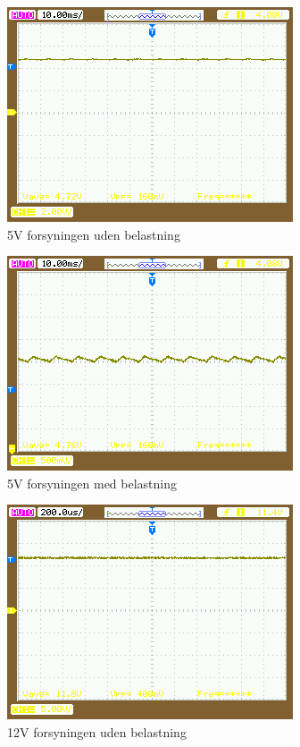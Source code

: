 \begin{figure}[H]
	\centering
	\includegraphics[scale=1]{../Hardware/PSU/Realisering/5VnoLoad}
	\caption{5V forsyningen uden belastning}
	\label{photo:5VnoLoad}
\end{figure}
\begin{figure}[H]
	\centering
	\includegraphics[scale=1]{../Hardware/PSU/Realisering/5VwithLoad}
	\caption{5V forsyningen med belastning}
	\label{photo:5VwithLoad}
\end{figure}
\begin{figure}[H]
	\centering
	\includegraphics[scale=1]{../Hardware/PSU/Realisering/12VnoLoad}
	\caption{12V forsyningen uden belastning}
	\label{photo:12VnoLoad}
\end{figure}
